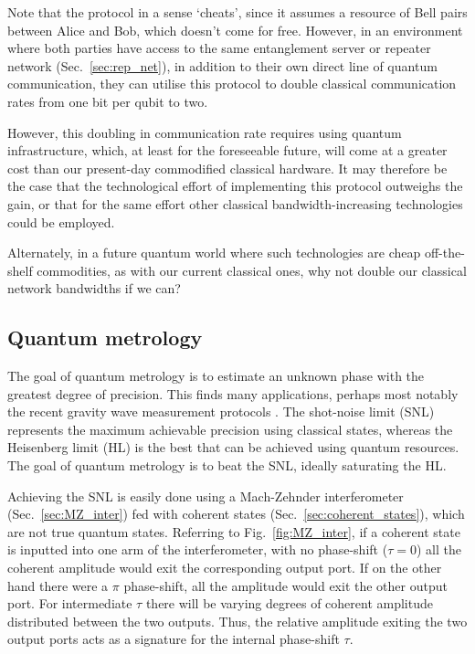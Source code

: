 Note that the protocol in a sense `cheats', since it assumes a resource of Bell pairs between Alice and Bob, which doesn't come for free. However, in an environment where both parties have access to the same entanglement server or repeater network (Sec.~\ref{sec:rep_net}), in addition to their own direct line of quantum communication, they can utilise this protocol to double classical communication rates from one bit per qubit to two.

However, this doubling in communication rate requires using quantum infrastructure, which, at least for the foreseeable future, will come at a greater cost than our present-day commodified classical hardware. It may therefore be the case that the technological effort of implementing this protocol outweighs the gain, or that for the same effort other classical bandwidth-increasing technologies could be employed.

Alternately, in a future quantum world where such technologies are cheap off-the-shelf commodities, as with our current classical ones, why not double our classical network bandwidths if we can?

%
%

\subsection{Quantum metrology} \label{sec:metrology} 

The goal of quantum metrology is to estimate an unknown phase with the greatest degree of precision. This finds many applications, perhaps most notably the recent gravity wave measurement protocols \cite{???}. The shot-noise limit (SNL) represents the maximum achievable precision using classical states, whereas the Heisenberg limit (HL) is the best that can be achieved using quantum resources. The goal of quantum metrology is to beat the SNL, ideally saturating the HL.

Achieving the SNL is easily done using a Mach-Zehnder interferometer (Sec.~\ref{sec:MZ_inter}) fed with coherent states (Sec.~\ref{sec:coherent_states}), which are not true quantum states. Referring to Fig.~\ref{fig:MZ_inter}, if a coherent state is inputted into one arm of the interferometer, with no phase-shift (\mbox{$\tau=0$}) all the coherent amplitude would exit the corresponding output port. If on the other hand there were a $\pi$ phase-shift, all the amplitude would exit the other output port. For intermediate $\tau$ there will be varying degrees of coherent amplitude distributed between the two outputs. Thus, the relative amplitude exiting the two output ports acts as a signature for the internal phase-shift $\tau$.


